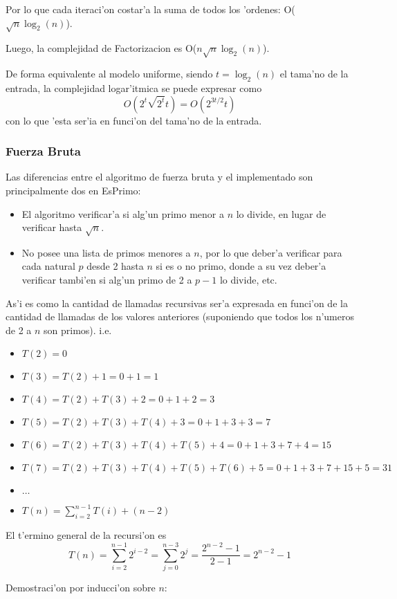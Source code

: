Por lo que cada iteraci'on costar'a la suma de todos los 'ordenes: O($\sqrt{n}\log_2(n)$).

Luego, la complejidad de Factorizacion es O($n\sqrt{n}\log_2(n)$).

De forma equivalente al modelo uniforme, siendo $t = \log_2(n)$ el tama'no de la entrada, la complejidad logar'itmica se puede expresar como 
$$O(2^t\sqrt{2^t}t) = O(2^{3t/2}t)$$
con lo que 'esta ser'ia  en funci'on del tama'no de la entrada.

\subsubsection{Fuerza Bruta}
Las diferencias entre el algoritmo de fuerza bruta y el implementado son principalmente dos en EsPrimo:
\begin{itemize}
\item El algoritmo verificar'a si alg'un primo menor a $n$ lo divide, en lugar de verificar hasta $\sqrt{n}$.
\item No posee una lista de primos menores a $n$, por lo que deber'a verificar para cada natural $p$ desde 2 hasta $n$ si es o no primo, donde a su vez deber'a verificar tambi'en si alg'un primo de 2 a $p-1$ lo divide, etc.
\end{itemize}
As'i es como la cantidad de llamadas recursivas ser'a expresada en funci'on de la cantidad de llamadas de los valores anteriores (suponiendo que todos los n'umeros de 2 a $n$ son primos). i.e.
\begin{itemize}
\item $T(2) = 0$
\item $T(3) = T(2) + 1 = 0 + 1 = 1$
\item $T(4) = T(2) + T(3) + 2 = 0 + 1 + 2 = 3$
\item $T(5) = T(2) + T(3) + T(4) + 3 = 0 + 1 + 3 + 3 = 7$
\item $T(6) = T(2) + T(3) + T(4) + T(5) + 4 = 0 + 1 + 3 + 7 + 4 = 15$
\item $T(7) = T(2) + T(3) + T(4) + T(5) + T(6) + 5 = 0 + 1 + 3 + 7 + 15 + 5 = 31$
\item $\dots$
\item $T(n) = \sum_{i=2}^{n-1}{T(i)} + (n-2)$
\end{itemize}

El t'ermino general de la recursi'on es
$$T(n) = \sum_{i=2}^{n-1}{2^{i-2}} = \sum_{j=0}^{n-3}{2^j} = \frac{2^{n-2}-1}{2-1} = 2^{n-2} - 1$$

Demostraci'on por inducci'on sobre $n$:

